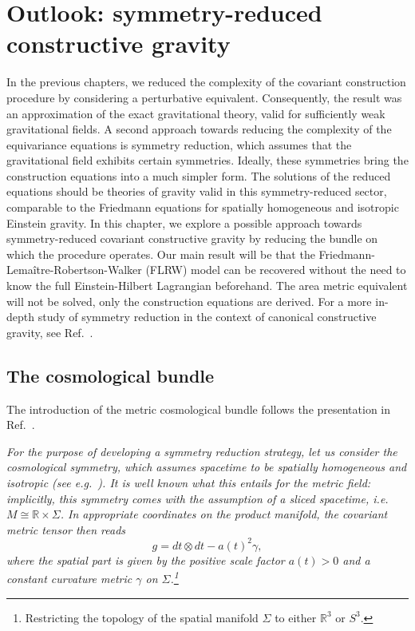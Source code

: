 \chapter{Outlook: symmetry-reduced constructive gravity}\label{chapter_cosmo}

In the previous chapters, we reduced the complexity of the covariant construction procedure by considering a perturbative equivalent. Consequently, the result was an approximation of the exact gravitational theory, valid for sufficiently weak gravitational fields. A second approach towards reducing the complexity of the equivariance equations is symmetry reduction, which assumes that the gravitational field exhibits certain symmetries. Ideally, these symmetries bring the construction equations into a much simpler form. The solutions of the reduced equations should be theories of gravity valid in this symmetry-reduced sector, comparable to the Friedmann equations for spatially homogeneous and isotropic Einstein gravity. In this chapter, we explore a possible approach towards symmetry-reduced covariant constructive gravity by reducing the bundle on which the procedure operates. Our main result will be that the Friedmann-Lema\^itre-Robertson-Walker (FLRW) model can be recovered without the need to know the full Einstein-Hilbert Lagrangian beforehand. The area metric equivalent will not be solved, only the construction equations are derived. For a more in-depth study of symmetry reduction in the context of canonical constructive gravity, see Ref.\ \cite{Duell_2020}.

\section{The cosmological bundle}
The introduction of the metric cosmological bundle follows the presentation in Ref.\ \cite{Alex_2020}.

\itshape
For the purpose of developing a symmetry reduction strategy, let us consider the cosmological symmetry, which assumes spacetime to be spatially homogeneous and isotropic (see e.g.\ \cite{Weinberg_1972,Wald_1984}). It is well known what this entails for the metric field: implicitly, this symmetry comes with the assumption of a sliced spacetime, i.e.\ $M \cong \mathbb R \times \Sigma$. In appropriate coordinates on the product manifold, the covariant metric tensor then reads \cite{Weinberg_1972,Katanaev_2016}
\begin{equation}
  g = dt \otimes dt - a(t)^2 \gamma,
\end{equation}
where the spatial part is given by the positive \emph{scale factor} $a(t) > 0$ and a constant curvature metric $\gamma$ on $\Sigma$.\footnote{Restricting the topology of the spatial manifold $\Sigma$ to either $\mathbb R^3$ or $S^3$.}

